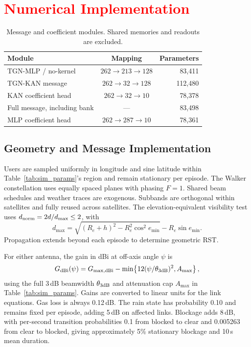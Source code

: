 \documentclass[10pt,letterpaper,journal]{IEEEtran}
\newcommand{\revnew}[1]{\textcolor{red}{#1}}
\begin{document}
\section{\revnew{Numerical Implementation}}
\label{app:implementation}
\begingroup
\color{red}

\begin{table}[!t]
\color{red}\centering\footnotesize
\caption{Message and coefficient modules. Shared memories and readouts are excluded.}
\label{tab:message_implementations}
\setlength{\tabcolsep}{3pt}
\begin{tabular}{@{}lcr@{}}
\toprule
Module & Mapping & Parameters \\
\midrule
TGN-MLP / no-kernel & $262\to213\to128$ & 83,411 \\
TGN-KAN message & $262\to32\to128$ & 112,480 \\
KAN coefficient head & $262\to32\to10$ & 78,378 \\
Full message, including bank & --- & 83,498 \\
MLP coefficient head & $262\to287\to10$ & 78,361 \\
\bottomrule
\end{tabular}
\end{table}

\subsection{Geometry and Message Implementation}
Users are sampled uniformly in longitude and sine latitude within Table~\ref{tab:sim_params}'s region and remain stationary per episode. The Walker constellation uses equally spaced planes with phasing $F=1$. Shared beam schedules and weather traces are exogenous. Subbands are orthogonal within satellites and fully reused across satellites. The elevation-equivalent visibility test uses $d_{\rm norm}=2d/d_{\max}\le2$, with
\[
d_{\max}=\sqrt{(R_e+h)^2-R_e^2\cos^2e_{\min}}-R_e\sin e_{\min}.
\]
Propagation extends beyond each episode to determine geometric RST.

For either antenna, the gain in dBi at off-axis angle $\psi$ is
\[
G_{\rm dBi}(\psi)=G_{\max,\rm dBi}
-\min\!\left\{12(\psi/\theta_{3\rm dB})^2,A_{\max}\right\},
\]
using the full 3\,dB beamwidth $\theta_{3\rm dB}$ and attenuation cap $A_{\max}$ in Table~\ref{tab:sim_params}. Gains are converted to linear units for the link equations.
Gas loss is always 0.12\,dB. The rain state has probability 0.10 and remains fixed per episode, adding 5\,dB on affected links. Blockage adds 8\,dB, with per-second transition probabilities 0.1 from blocked to clear and 0.005263 from clear to blocked, giving approximately 5\% stationary blockage and 10\,s mean duration.
\end{document}
